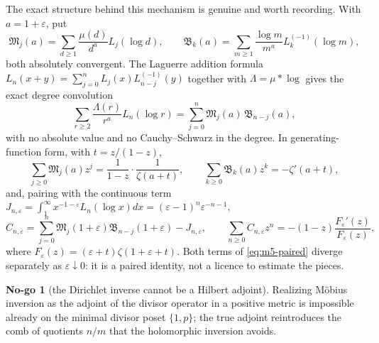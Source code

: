 \documentclass[11pt]{amsart}
\theoremstyle{definition}
\theoremstyle{remark}
\theoremstyle{definition}
\newtheorem{nogo}{No-go}[section]
\newcommand{\eps}{\varepsilon}
\begin{document}
The exact structure behind this mechanism is genuine and worth recording. With
$a=1+\eps$, put
\begin{equation}\label{eq:MB}
   \mathfrak M_j(a)=\sum_{d\ge1}\frac{\mu(d)}{d^a}L_j(\log d),
   \qquad
   \mathfrak B_k(a)=\sum_{m\ge1}\frac{\log m}{m^a}L^{(-1)}_k(\log m),
\end{equation}
both absolutely convergent. The Laguerre addition formula
$L_n(x+y)=\sum_{j=0}^nL_j(x)L^{(-1)}_{n-j}(y)$ together with $\Lambda=\mu*\log$ gives the exact
degree convolution
\begin{equation}\label{eq:degree-conv}
   \sum_{r\ge2}\frac{\Lambda(r)}{r^a}L_n(\log r)
   =\sum_{j=0}^n\mathfrak M_j(a)\,\mathfrak B_{n-j}(a),
\end{equation}
with no absolute value and no Cauchy--Schwarz in the degree. In generating-function form, with
$t=z/(1-z)$,
\begin{equation}\label{eq:MB-gen}
   \sum_{j\ge0}\mathfrak M_j(a)z^j=\frac{1}{1-z}\cdot\frac{1}{\zeta(a+t)},
   \qquad
   \sum_{k\ge0}\mathfrak B_k(a)z^k=-\zeta'(a+t),
\end{equation}
and, pairing with the continuous term
$J_{n,\eps}=\int_1^\infty x^{-1-\eps}L_n(\log x)dx=(\eps-1)^n\eps^{-n-1}$,
\begin{equation}\label{eq:m5-paired}
   C_{n,\eps}=\sum_{j=0}^n\mathfrak M_j(1+\eps)\mathfrak B_{n-j}(1+\eps)-J_{n,\eps},
   \qquad
   \sum_{n\ge0}C_{n,\eps}z^n=-(1-z)\frac{F_\eps'(z)}{F_\eps(z)},
\end{equation}
where $F_\eps(z)=(\eps+t)\zeta(1+\eps+t)$. Both terms of \eqref{eq:m5-paired} diverge separately
as $\eps\downarrow0$: it is a paired identity, not a licence to estimate the pieces.

\begin{nogo}[the Dirichlet inverse cannot be a Hilbert adjoint]\label{ng:m5-gram}
Realizing M\"obius inversion as the adjoint of the divisor operator in a positive metric is
impossible already on the minimal divisor poset $\{1,p\}$; the true adjoint reintroduces the comb
of quotients $n/m$ that the holomorphic inversion avoids.
\end{nogo}
\end{document}

